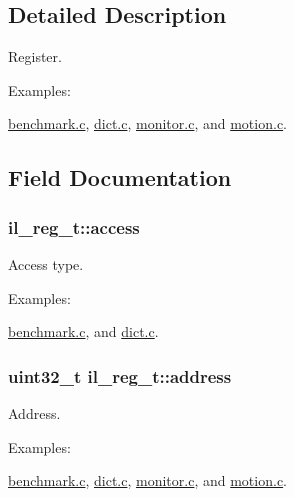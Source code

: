 \subsection{Detailed Description}
Register. 

\begin{Desc}
\item[Examples\+: ]\par
\hyperlink{benchmark_8c-example}{benchmark.\+c}, \hyperlink{dict_8c-example}{dict.\+c}, \hyperlink{monitor_8c-example}{monitor.\+c}, and \hyperlink{motion_8c-example}{motion.\+c}.\end{Desc}


\subsection{Field Documentation}
\subsubsection[{\texorpdfstring{access}{access}}]{ il\+\_\+reg\+\_\+t\+::access}\hypertarget{structil__reg__t_a8cd718765e48f0de2f978de386c61218}{}\label{structil__reg__t_a8cd718765e48f0de2f978de386c61218}


Access type. 

\begin{Desc}
\item[Examples\+: ]\par
\hyperlink{benchmark_8c-example}{benchmark.\+c}, and \hyperlink{dict_8c-example}{dict.\+c}.\end{Desc}
\subsubsection[{\texorpdfstring{address}{address}}]{\setlength{\rightskip}{0pt plus 5cm}uint32\+\_\+t il\+\_\+reg\+\_\+t\+::address}\hypertarget{structil__reg__t_ac0433a8ae86e0990fa59a074a5ad1bd1}{}\label{structil__reg__t_ac0433a8ae86e0990fa59a074a5ad1bd1}


Address. 

\begin{Desc}
\item[Examples\+: ]\par
\hyperlink{benchmark_8c-example}{benchmark.\+c}, \hyperlink{dict_8c-example}{dict.\+c}, \hyperlink{monitor_8c-example}{monitor.\+c}, and \hyperlink{motion_8c-example}{motion.\+c}.\end{Desc}
